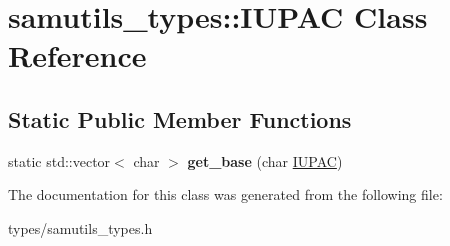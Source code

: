 \hypertarget{classsamutils__types_1_1_i_u_p_a_c}{
\section{samutils\_\-types::IUPAC Class Reference}
\label{classsamutils__types_1_1_i_u_p_a_c}
}
\subsection*{Static Public Member Functions}
\begin{DoxyCompactItemize}
\item 
\hypertarget{classsamutils__types_1_1_i_u_p_a_c_a9765883d326384f11717138811811cd2}{
static std::vector$<$ char $>$ {\bfseries get\_\-base} (char \hyperlink{classsamutils__types_1_1_i_u_p_a_c}{IUPAC})}
\label{classsamutils__types_1_1_i_u_p_a_c_a9765883d326384f11717138811811cd2}

\end{DoxyCompactItemize}


The documentation for this class was generated from the following file:\begin{DoxyCompactItemize}
\item 
types/samutils\_\-types.h\end{DoxyCompactItemize}
